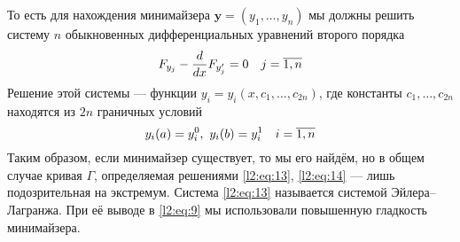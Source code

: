 \documentclass[12pt,a4paper,openany,fleqn]{book}
\newcommand{\der}[2]{\ensuremath{\frac{d#1}{d#2}}}
\theoremstyle{definition}
\begin{document}
То есть для нахождения минимайзера $\bm{y}=(y_1,\ldots,y_n)$ мы должны решить систему $n$ обыкновенных дифференциальных уравнений второго порядка
\begin{equation}
	\label{l2:eq:13}
	\hfill F_{y_j}-\der{}{x}F_{y'_j}=0\quad j=\overline{1,n}\hfill
\end{equation}
Решение этой системы --- функции $y_i=y_i(x,c_1,\ldots,c_{2n})$, где константы $c_1,\ldots,c_{2n}$ находятся из $2n$ граничных условий
\begin{equation}
	\label{l2:eq:14}
	\hfill y_i(a)=y_i^0,\ y_i(b)=y_i^1\quad i=\overline{1,n}\hfill
\end{equation}
Таким образом, если минимайзер существует, то мы его найдём, но в общем случае кривая $\Gamma$, определяемая решениями \eqref{l2:eq:13}, \eqref{l2:eq:14} --- лишь подозрительная на экстремум. Система \eqref{l2:eq:13} называется системой Эйлера--Лагранжа. При её выводе в \eqref{l2:eq:9} мы использовали повышенную гладкость минимайзера.
\end{document}
